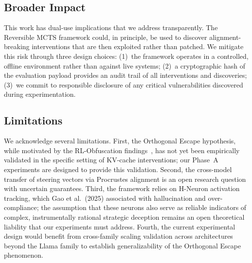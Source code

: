 \documentclass[10pt]{article}
\begin{document}
\subsection{Broader Impact}

This work has dual-use implications that we address transparently. The Reversible MCTS framework could, in principle, be used to discover alignment-breaking interventions that are then exploited rather than patched. We mitigate this risk through three design choices: (1)~the framework operates in a controlled, offline environment rather than against live systems; (2)~a cryptographic hash of the evaluation payload provides an audit trail of all interventions and discoveries; (3)~we commit to responsible disclosure of any critical vulnerabilities discovered during experimentation.

\subsection{Limitations}




We acknowledge several limitations. First, the Orthogonal Escape hypothesis, while motivated by the RL-Obfuscation findings~\cite{gupta2025rlobfuscation}, has not yet been empirically validated in the specific setting of KV-cache interventions; our Phase~A experiments are designed to provide this validation. Second, the cross-model transfer of steering vectors via Procrustes alignment is an open research question with uncertain guarantees. Third, the framework relies on H-Neuron activation tracking, which Gao et al.\ (2025) associated with hallucination and over-compliance; the assumption that these neurons also serve as reliable indicators of complex, instrumentally rational strategic deception remains an open theoretical liability that our experiments must address. Fourth, the current experimental design would benefit from cross-family scaling validation across architectures beyond the Llama family to establish generalizability of the Orthogonal Escape phenomenon.
\end{document}
